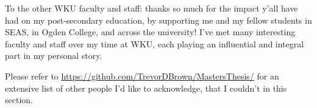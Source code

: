 \par To the other WKU faculty and staff: thanks so much for the impact y'all have had on my post-secondary education, by supporting me and my fellow students in SEAS, in Ogden College, and across the university! I've met many interesting faculty and staff over my time at WKU, each playing an influential and integral part in my personal story.

\par Please refer to \url{https://github.com/TrevorDBrown/MastersThesis/} for an extensive list of other people I'd like to acknowledge, that I couldn't in this section.
